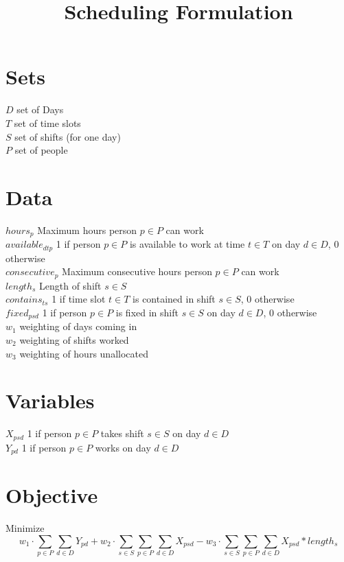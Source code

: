 \documentclass{article}
\title{Scheduling Formulation}
\begin{document}
\maketitle
\newpage

\section*{Sets}
$D$ set of Days \\
$T$ set of time slots \\
$S$ set of shifts (for one day) \\
$P$ set of people

\section*{Data}
$hours_p$ Maximum hours person $p \in P$ can work \\
$available_{dtp}$ 1 if person $p \in P$ is available to work at time $t \in T$ on day $d \in D$, 0 otherwise \\
$consecutive_p$ Maximum consecutive hours person $p \in P$ can work \\
$length_s$ Length of shift $s \in S$ \\
$contains_{ts}$ 1  if time slot $t \in T$ is contained in shift $s \in S$, 0 otherwise \\
$fixed_{psd}$ 1 if person $p \in P$ is fixed in shift $s \in S$ on day $d \in D$, 0 otherwise \\
$w_1$ weighting of days coming in \\
$w_2$ weighting of shifts worked \\
$w_3$ weighting of hours unallocated \\

\section*{Variables}
$X_{psd}$ 1 if person $p \in P$ takes shift $s \in S$ on day $d \in D$ \\
$Y_{pd}$ 1 if person $p \in P$ works on day $d \in D$

\section*{Objective}
Minimize 
$$w_1 \cdot \sum_{p \in P} \sum_{d \in D} Y_{pd} + w_2 \cdot \sum_{s \in S} \sum_{p \in P} \sum_{d \in D} X_{psd} - w_3 \cdot \sum_{s \in S} \sum_{p \in P} \sum_{d \in D} X_{psd} * length_{s}$$ %
\end{document}
